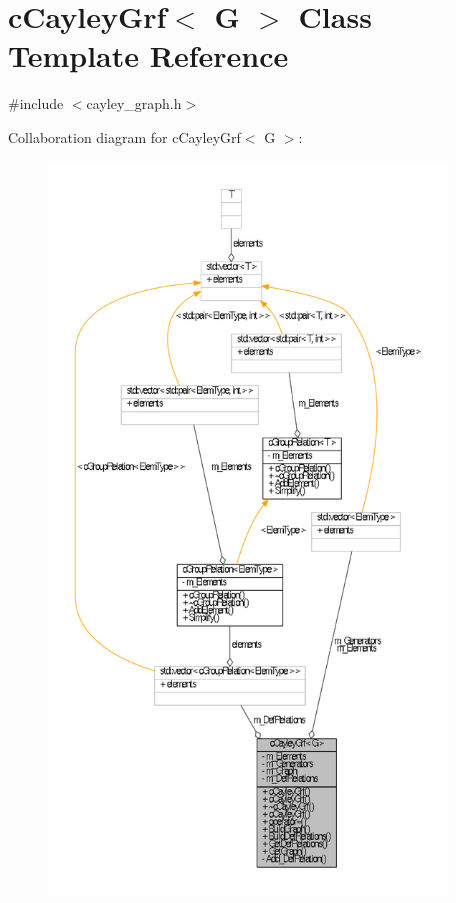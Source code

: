 \hypertarget{classcCayleyGrf}{\section{c\-Cayley\-Grf$<$ \-G $>$ \-Class \-Template \-Reference}
\label{classcCayleyGrf}
}


{\ttfamily \#include $<$cayley\-\_\-graph.\-h$>$}



\-Collaboration diagram for c\-Cayley\-Grf$<$ \-G $>$\-:\nopagebreak
\begin{figure}[H]
\begin{center}
\leavevmode
\includegraphics[height=550pt]{classcCayleyGrf__coll__graph}
\end{center}
\end{figure}
